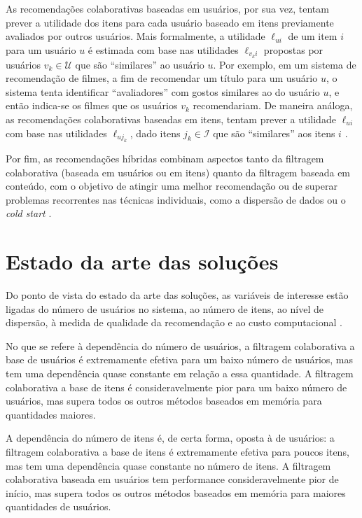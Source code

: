 As recomendações colaborativas baseadas em usuários, por sua vez, tentam prever a utilidade dos itens para cada usuário baseado em itens previamente avaliados por outros usuários. Mais formalmente, a utilidade $\ell_{ui}$ de um item $i$ para um usuário $u$ é estimada com base nas utilidades $\ell_{v_k i}$ propostas por usuários $v_k \in \mathcal{U}$ que são ``similares'' ao usuário $u$. Por exemplo, em um sistema de recomendação de filmes, a fim de recomendar um título para um usuário $u$, o sistema tenta identificar ``avaliadores'' com gostos similares ao do usuário $u$, e então indica-se os filmes que os usuários $v_k$ recomendariam. De maneira análoga, as recomendações colaborativas baseadas em itens, tentam prever a utilidade $\ell_{ui}$ com base nas utilidades $\ell_{u j_k}$, dado itens $j_k \in \mathcal{I}$ que são ``similares'' aos itens $i$ \cite{linden2003amazon}.

Por fim, as recomendações híbridas combinam aspectos tanto da filtragem colaborativa (baseada em usuários ou em itens) quanto da filtragem baseada em conteúdo, com o objetivo de atingir uma melhor recomendação ou de superar problemas recorrentes nas técnicas individuais, como a dispersão de dados ou o \textit{cold start} \cite{burke2007hybrid}. 

\section{Estado da arte das soluções} %
\label{sec:estado_da_arte_das_solu_es}

Do ponto de vista do estado da arte das soluções, as variáveis de interesse estão ligadas do número de usuários no sistema, ao número de itens, ao nível de dispersão, à medida de qualidade da recomendação e ao custo computacional \cite{lee2012comparative}. 

No que se refere à dependência do número de usuários, a filtragem colaborativa a base de usuários é extremamente efetiva para um baixo número de usuários, mas tem uma dependência quase constante em relação a essa quantidade. A filtragem colaborativa a base de itens é consideravelmente pior para um baixo número de usuários, mas supera todos os outros métodos baseados em memória para quantidades maiores.

A dependência do número de itens é, de certa forma, oposta à de usuários: a filtragem colaborativa a base de itens é extremamente efetiva para poucos itens, mas tem uma dependência quase constante no número de itens. A filtragem colaborativa baseada em usuários tem performance consideravelmente pior de início, mas supera todos os outros métodos baseados em memória para maiores quantidades de usuários.

